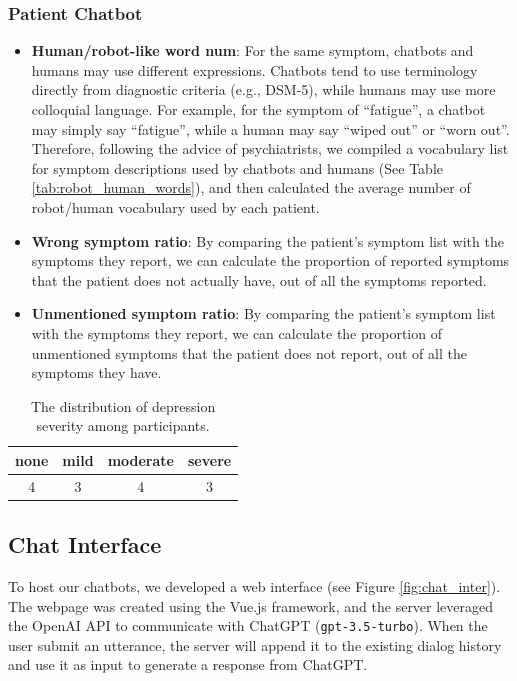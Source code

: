 \subsubsection{Patient Chatbot}
\begin{itemize}
    \item \textbf{Human/robot-like word num}: For the same symptom, chatbots and humans may use different expressions. Chatbots tend to use terminology directly from diagnostic criteria (e.g., DSM-5), while humans may use more colloquial language. For example, for the symptom of ``fatigue'', a chatbot may simply say ``fatigue'', while a human may say ``wiped out'' or ``worn out''. Therefore, following the advice of psychiatrists, we compiled a vocabulary list for symptom descriptions used by chatbots and humans (See Table \ref{tab:robot_human_words}), and then calculated the average number of robot/human vocabulary used by each patient.
    \item \textbf{Wrong symptom ratio}: By comparing the patient's symptom list with the symptoms they report, we can calculate the proportion of reported symptoms that the patient does not actually have, out of all the symptoms reported.
    \item \textbf{Unmentioned symptom ratio}: By comparing the patient's symptom list with the symptoms they report, we can calculate the proportion of unmentioned symptoms that the patient does not report, out of all the symptoms they have.
\end{itemize}

\begin{table}[th]
    \small
    \centering
    \begin{tabular}{cccc}
    \hline
     none & mild & moderate & severe \\ 
    \hline
    4 & 3 &4 & 3 \\
    \hline
    \end{tabular}
    \caption{The distribution of depression severity among participants.}
    \label{tab:distribution_seve}
\end{table}

\subsection{Chat Interface}
\label{sec:chatInterface}
To host our chatbots, we developed a web interface (see Figure \ref{fig:chat_inter}). The webpage was created using the Vue.js framework, and the server leveraged the OpenAI API to communicate with ChatGPT (\texttt{gpt-3.5-turbo}). When the user submit an utterance, the server will append it to the existing dialog history and use it as input to generate a response from ChatGPT. 

